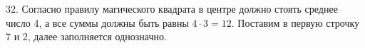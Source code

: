 32. Согласно правилу магического квадрата в центре должно стоять среднее число 4, а все суммы должны быть равны $4\cdot3=12.$ Поставим в первую строчку 7 и 2, далее заполняется однозначно.
\begin{center}
\begin{figure}[ht!]
\end{figure}
\end{center}
